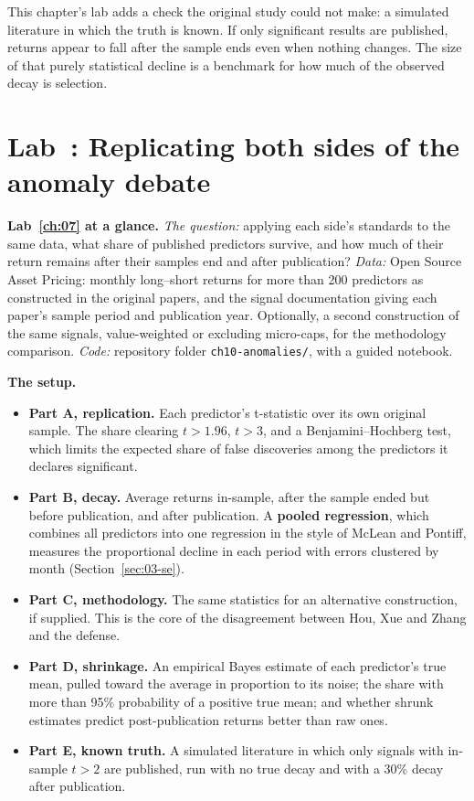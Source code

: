 This chapter's lab adds a check the original study could not make: a simulated literature in which the truth is known. If only significant results are published, returns appear to fall after the sample ends even when nothing changes. The size of that purely statistical decline is a benchmark for how much of the observed decay is selection.

\section{Lab~\thechapter: Replicating both sides of the anomaly debate}
\label{sec:07-lab}

\begin{callout}
\textbf{Lab~\ref{ch:07} at a glance.} \emph{The question:} applying each side's standards to the same data, what share of published predictors survive, and how much of their return remains after their samples end and after publication? \emph{Data:} Open Source Asset Pricing: monthly long--short returns for more than 200 predictors as constructed in the original papers, and the signal documentation giving each paper's sample period and publication year. Optionally, a second construction of the same signals, value-weighted or excluding micro-caps, for the methodology comparison. \emph{Code:} repository folder \texttt{ch10-anomalies/}, with a guided notebook.
\end{callout}

\textbf{The setup.}

\begin{itemize}
  \item \textbf{Part A, replication.} Each predictor's t-statistic over its own original sample. The share clearing $t > 1.96$, $t > 3$, and a Benjamini--Hochberg test, which limits the expected share of false discoveries among the predictors it declares significant.
  \item \textbf{Part B, decay.} Average returns in-sample, after the sample ended but before publication, and after publication. A \textbf{pooled regression}, which combines all predictors into one regression in the style of McLean and Pontiff, measures the proportional decline in each period with errors clustered by month (Section~\ref{sec:03-se}).
  \item \textbf{Part C, methodology.} The same statistics for an alternative construction, if supplied. This is the core of the disagreement between Hou, Xue and Zhang and the defense.
  \item \textbf{Part D, shrinkage.} An empirical Bayes estimate of each predictor's true mean, pulled toward the average in proportion to its noise; the share with more than 95\% probability of a positive true mean; and whether shrunk estimates predict post-publication returns better than raw ones.
  \item \textbf{Part E, known truth.} A simulated literature in which only signals with in-sample $t > 2$ are published, run with no true decay and with a 30\% decay after publication.
\end{itemize}

